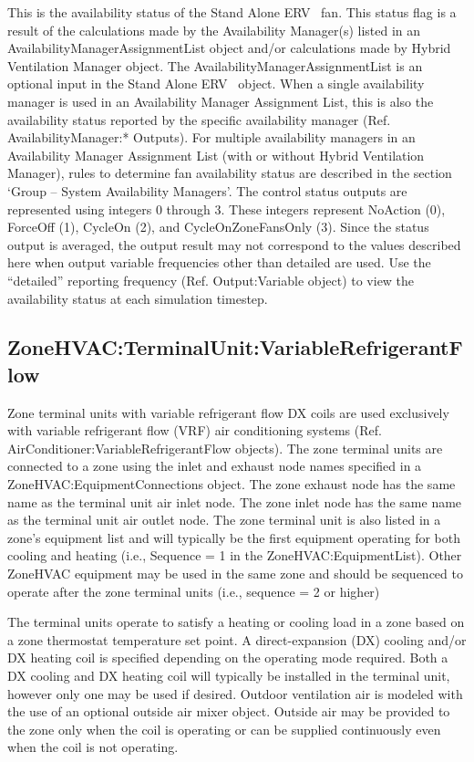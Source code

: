 This is the availability status of the Stand Alone ERV~ fan. This status flag is a result of the calculations made by the Availability Manager(s) listed in an AvailabilityManagerAssignmentList object and/or calculations made by Hybrid Ventilation Manager object. The AvailabilityManagerAssignmentList is an optional input in the Stand Alone ERV~ object. When a single availability manager is used in an Availability Manager Assignment List, this is also the availability status reported by the specific availability manager (Ref. AvailabilityManager:* Outputs). For multiple availability managers in an Availability Manager Assignment List (with or without Hybrid Ventilation Manager), rules to determine fan availability status are described in the section `Group -- System Availability Managers'. The control status outputs are represented using integers 0 through 3. These integers represent NoAction (0), ForceOff (1), CycleOn (2), and CycleOnZoneFansOnly (3). Since the status output is averaged, the output result may not correspond to the values described here when output variable frequencies other than detailed are used. Use the ``detailed'' reporting frequency (Ref. Output:Variable object) to view the availability status at each simulation timestep.

\subsection{ZoneHVAC:TerminalUnit:VariableRefrigerantFlow}\label{zonehvacterminalunitvariablerefrigerantflow}

Zone terminal units with variable refrigerant flow DX coils are used exclusively with variable refrigerant flow (VRF) air conditioning systems (Ref. AirConditioner:VariableRefrigerantFlow objects). The zone terminal units are connected to a zone using the inlet and exhaust node names specified in a ZoneHVAC:EquipmentConnections object. The zone exhaust node has the same name as the terminal unit air inlet node. The zone inlet node has the same name as the terminal unit air outlet node. The zone terminal unit is also listed in a zone's equipment list and will typically be the first equipment operating for both cooling and heating (i.e., Sequence = 1 in the ZoneHVAC:EquipmentList). Other ZoneHVAC equipment may be used in the same zone and should be sequenced to operate after the zone terminal units (i.e., sequence = 2 or higher)

The terminal units operate to satisfy a heating or cooling load in a zone based on a zone thermostat temperature set point. A direct-expansion (DX) cooling and/or DX heating coil is specified depending on the operating mode required. Both a DX cooling and DX heating coil will typically be installed in the terminal unit, however only one may be used if desired. Outdoor ventilation air is modeled with the use of an optional outside air mixer object. Outside air may be provided to the zone only when the coil is operating or can be supplied continuously even when the coil is not operating. 

